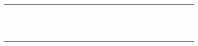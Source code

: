 \documentclass{article}
\renewcommand\_{\textunderscore\allowbreak}
\newcommand{\tagmcend}{}
\begin{document}
\begin{table}
\begin{tabular}{p{4.5cm}*{26}{D}}
\anonstrut\textcolor{codelabel}{} &  & \X & \X & \X & \X &  &  &  &  &  &  & \X &  &  & \X &  & \X &  &  &  & \X & \X & \X &  &  &  \\
\anonstrut\textcolor{codelabel}{} & \X &  & \X &  &  &  &  &  &  & \X & \X &  & \X & \X & \X & \X & \X &  &  &  &  &  &  &  &  &  \\
\anonstrut\textcolor{codelabel}{} & \X &  &  & \X &  &  &  & \X &  & \X &  & \X &  &  & \X & \X & \X & \X &  &  &  &  &  &  & \X & \X \\
\anonstrut\textcolor{codelabel}{} & \X &  & \X &  & \X &  &  &  &  & \X &  & \X & \X &  &  &  &  &  &  &  &  &  &  &  &  &  \\
\anonstrut\textcolor{codelabel}{} &  & \X & \X & \X & \X &  &  &  &  & \X &  & \X &  & \X & \X &  &  &  &  &  &  &  &  & \X &  & \X \\
\anonstrut\textcolor{codelabel}{} & \X &  & \X & \X &  &  &  &  &  & \X &  &  &  &  & \X & \X & \X &  &  &  &  &  &  &  &  &  \\
\anonstrut\textcolor{codelabel}{} & \X &  &  & \X &  &  & \X &  &  &  &  &  &  &  &  &  &  &  &  &  &  &  &  &  &  &  \\
\anonstrut\textcolor{codelabel}{} & \X &  & \X & \X &  &  & \X &  &  & \X &  & \X &  & \X & \X & \X & \X &  &  &  &  &  &  &  &  & \X \\
\anonstrut\textcolor{codelabel}{} & \X &  &  &  & \X &  &  &  &  & \X &  & \X &  & \X & \X &  &  &  &  &  &  & \X &  &  &  & \X \\
\anonstrut\textcolor{codelabel}{} & \X &  & \X &  & \X &  &  &  &  & \X &  & \X &  & \X & \X & \X & \X &  &  &  &  &  &  &  &  & \X \\
\anonstrut\textcolor{codelabel}{} &  & \X & \X &  & \X &  &  &  &  &  &  & \X &  &  & \X &  &  &  &  &  & \X &  &  &  &  & \X \\
\anonstrut\textcolor{codelabel}{} & \X &  & \X &  & \X &  &  &  &  & \X &  & \X &  & \X & \X & \X & \X &  &  &  &  &  &  &  &  & \X \\
\citet{khakmardanComparativeLifeCycle2023} &  & \X & \X &  & \X &  & \X & \X &  & \X &  & \X &  & \X & \X &  & \X &  &  &  &  &  &  &  &  &  \\
\anonstrut\textcolor{codelabel}{} & \X &  &  &  & \X &  &  &  &  & \X &  & \X &  &  & \X & \X & \X &  &  &  &  &  &  &  &  &  \\
\bottomrule
\end{tabular}
\end{table}
\tagmcend
 
\end{document}

